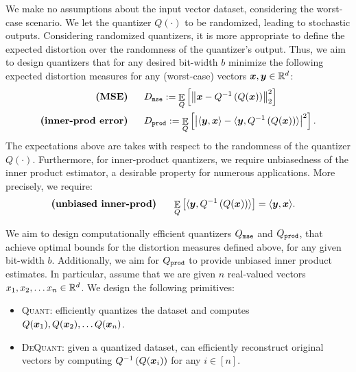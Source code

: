 \documentclass[11pt]{article}
\begin{document}
We make no assumptions about the input vector dataset, considering the worst-case scenario. 
We let the quantizer $Q(\cdot)$ to be randomized, leading to stochastic outputs.
Considering randomized quantizers, it is more appropriate to define the expected distortion over the randomness of the quantizer's output. 
Thus, we aim to design quantizers that for any desired bit-width $b$ minimize the following expected distortion measures for any (worst-case) vectors ${\bm x}, {\bm y} \in \mathbb{R}^d$:
\begin{align}
    \textbf{(MSE)}~~~~~ & D_{\tt mse} := \mathop{{\mathbb{E}}}_{Q}\left[\left\| {\bm x} - Q^{-1}\left( Q({\bm x}) \right) \right\|_2^2 \right] \label{eq:mse}\\
    \textbf{(inner-prod error)}~~~~~ & D_{\tt prod} := \mathop{{\mathbb{E}}}_{Q}\left[\left| \langle {\bm y}, {\bm x} \rangle - \langle {\bm y}, Q^{-1}\left( Q({\bm x}) \right) \rangle \right|^2 \right]. \label{eq:prod_error}
\end{align}
The expectations above are takes with respect to the randomness of the quantizer $Q(\cdot)$.
Furthermore, for inner-product quantizers, we require unbiasedness of the inner product estimator, a desirable property for numerous applications.
More precisely, we require:
\begin{align*}
    \textbf{(unbiased inner-prod)}~~~~~ &\mathop{{\mathbb{E}}}_{Q}\left[ \langle {\bm y}, Q^{-1}\left( Q({\bm x}) \right) \rangle\right] = \langle {\bm y}, {\bm x} \rangle.
\end{align*}


We aim to design computationally efficient quantizers $Q_{\tt mse}$ and $Q_{\tt prod}$, that achieve optimal bounds for the distortion measures defined above, for any given bit-width $b$. 
Additionally, we aim for $Q_{\tt prod}$ to provide unbiased inner product estimates. 
In particular, assume that we are given $n$ real-valued vectors $x_1, x_2, \ldots x_n \in \mathbb{R}^d$. We design the following primitives:
\begin{itemize}
    \item \textsc{Quant}: efficiently quantizes the dataset and computes $Q({\bm x}_1), Q({\bm x}_2), \ldots Q({\bm x}_n)$. 
    \item \textsc{DeQuant}: given a quantized dataset, can efficiently reconstruct original vectors by computing $Q^{-1}\left( Q({\bm x}_i) \right)$ for any $i \in [n]$.
\end{itemize}
\end{document}

